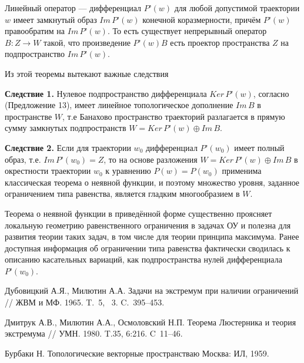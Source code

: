 \begin{theorem} Линейный оператор --- дифференциал $P’(w)$ для любой допустимой траектории $w$ имеет замкнутый образ $Im\,P’(w)$ конечной коразмерности, причём $P’(w)$ правообратим на $Im\,P’(w)$. То есть существует непрерывный оператор $B:Z\to W$ такой, что произведение $P’(w)B$  есть проектор пространства $Z$  на  подпространство $Im\,P’(w)$.  
\end{theorem}

Из этой теоремы вытекают важные следствия

{\bf Следствие 1.} Нулевое подпространство дифференциала $Ker\, P’(w)$, согласно \cite{Dub3}(Предложение 13), имеет линейное топологическое дополнение $Im\, B$ в пространстве $W$, т.е Банахово пространство траекторий разлагается в прямую сумму замкнутых подпространств $W=Ker\,P’(w) \oplus Im\, B$. 

{\bf Следствие 2.} Если для траектории $w_0$ дифференциал $P’(w_0)$ имеет полный образ, т.е. $Im\, P’(w_0)=Z$, то на основе разложения $W=Ker\, P’(w)\oplus Im\, B$  в окрестности траектории $w_0$  к уравнению $P(w)=P(w_0)$ применима классическая теорема о неявной функции, и поэтому множество уровня, заданное ограничением типа равенства,  является гладким многообразием в $W$. 

Теорема о неявной функции в приведённой форме существенно проясняет локальную геометрию равенственного ограничения в задачах ОУ и полезна для развития теории таких задач, в том числе для теории принципа максимума. Ранее доступная  информация об ограничении типа равенства фактически сводилась к описанию касательных вариаций, как подпространства нулей дифференциала $P’(w_0)$.






\begin{thebibliography}{9} %


 Дубовицкий А.Я., Милютин А.А. Задачи на экстремум при наличии ограничений // ЖВМ и МФ. 1965. T.~5, \textnumero~3. C.~395--453.

 Дмитрук А.В., Милютин А.А., Осмоловский Н.П. Теорема Люстерника и теория экстремума // УМН. 1980. T.35,  6:216. C~11--46.

  Бурбаки Н. Топологические векторные пространстваю Москва: ИЛ, 1959.


\end{thebibliography}




%

